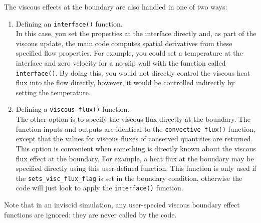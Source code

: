 The viscous effects at the boundary are also handled in one of two ways:
\begin{enumerate}
 \item Defining an \verb!interface()! function.\\
  In this case, you set the properties at the interface directly
  and, as part of the viscous update, the main code computes spatial derivatives from these specified
  flow properties. 
  For example, you could set a temperature at the interface and zero velocity for a no-slip wall
  with the function called \verb!interface()!. 
  By doing this, you would not directly control the viscous heat flux into the flow directly, 
  however, it would be controlled indirectly by setting the temperature.
 \item Defining a \verb!viscous_flux()! function. \\
  The other option is to specify the viscous flux directly at the boundary.
  The function inputs and outputs are identical to the \verb!convective_flux()! function,
  except that the values for viscous fluxes of conserved quantities are returned.
  This option is convenient when something is directly known about the viscous
  flux effect at the boundary.
  For example, a heat flux at the boundary may be specified directly using this
  user-defined function.
  This function is only used if the \verb!sets_visc_flux_flag! is set in the boundary condition,
  otherwise the code will just look to apply the \verb!interface()! function.
\end{enumerate}
Note that in an inviscid simulation, any user-specied viscous boundary effect functions
are ignored: they are never called by the code.

